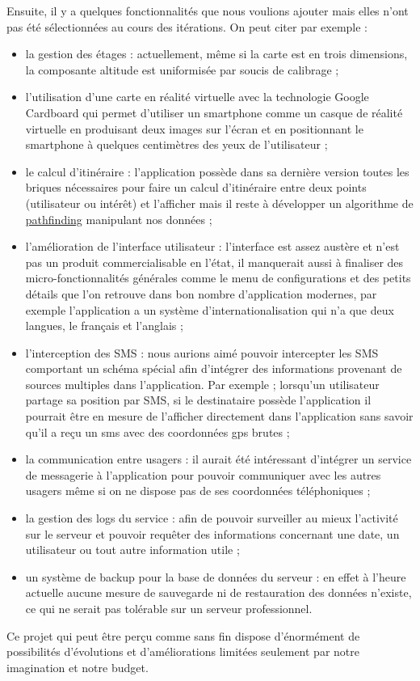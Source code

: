 Ensuite, il y a quelques fonctionnalités que nous voulions ajouter mais elles n’ont pas été sélectionnées au cours des itérations. On peut citer par exemple :
\begin{itemize}
    \item la gestion des étages : actuellement, même si la carte est en trois dimensions, la composante altitude est uniformisée par soucis de calibrage ;
    \item l’utilisation d’une carte en réalité virtuelle avec la technologie Google Cardboard qui permet d’utiliser un smartphone comme un casque de réalité virtuelle en produisant deux images sur l’écran et en positionnant le smartphone à quelques centimètres des yeux de l’utilisateur ;
    \item le calcul d’itinéraire : l’application possède dans sa dernière version toutes les briques nécessaires pour faire un calcul d’itinéraire entre deux points (utilisateur ou intérêt) et l’afficher mais il reste à développer un algorithme de \underline{pathfinding} manipulant nos données ;
    \item l’amélioration de l’interface utilisateur : l’interface est assez austère et n’est pas un produit commercialisable en l’état, il manquerait aussi à finaliser des micro-fonctionnalités générales comme le menu de configurations et des petits détails que l’on retrouve dans bon nombre d’application modernes, par exemple l’application a un système d’internationalisation qui n’a que deux langues, le français et l’anglais ;
    \item l’interception des SMS : nous aurions aimé pouvoir intercepter les SMS comportant un schéma spécial afin d’intégrer des informations provenant de sources multiples dans l’application. Par exemple ; lorsqu’un utilisateur partage sa position par SMS, si le destinataire possède l’application il pourrait être en mesure de l’afficher directement dans l’application sans savoir qu’il a reçu un sms avec des coordonnées gps brutes ;
    \item la communication entre usagers : il aurait été intéressant d’intégrer un service de messagerie à l’application pour pouvoir communiquer avec les autres usagers même si on ne dispose pas de ses coordonnées téléphoniques ;
    \item la gestion des logs du service : afin de pouvoir surveiller au mieux l’activité sur le serveur et pouvoir requêter des informations concernant une date, un utilisateur ou tout autre information utile ;
    \item un système de backup pour la base de données du serveur : en effet à l’heure actuelle aucune mesure de sauvegarde ni de restauration des données n’existe, ce qui ne serait pas tolérable sur un serveur professionnel.
\end{itemize}

Ce projet qui peut être perçu comme sans fin dispose d’énormément de possibilités d’évolutions et d’améliorations limitées seulement par notre imagination et notre budget.
